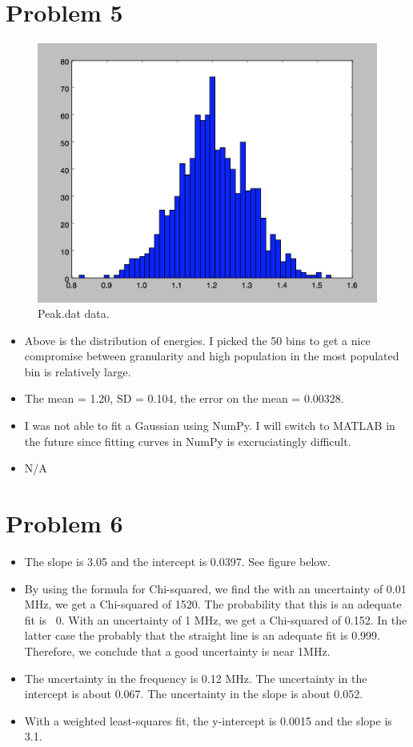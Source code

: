 \documentclass[12pt]{article}
\begin{document}
\clearpage


\section{Problem 5}

\begin{figure}[h!]
  \caption{Peak.dat data.}
  \centering
    \includegraphics[width=12 cm]{peak.png}
\end{figure}


\begin{itemize}
	\item Above is the distribution of energies. I picked the 50 bins to get a nice compromise between granularity and high population in the most populated bin is relatively large. 
	\item The mean = 1.20, SD = 0.104, the error on the mean = 0.00328.
	\item I was not able to fit a Gaussian using NumPy. I will switch to MATLAB in the future since fitting curves in NumPy is excruciatingly difficult. 
	\item N/A
\end{itemize}

\clearpage

\section{Problem 6}
\begin{itemize}
	\item The slope is 3.05 and the intercept is 0.0397. See figure below.
	\item By using the formula for Chi-squared, we find the with an uncertainty of 0.01 MHz, we get a Chi-squared of 1520. The probability that this is an adequate fit is ~0. With an uncertainty of 1 MHz, we get a Chi-squared of 0.152. In the latter case the probably that the straight line is an adequate fit is 0.999. Therefore, we conclude that a good uncertainty is near 1MHz. 
	\item The uncertainty in the frequency is 0.12 MHz. The uncertainty in the intercept is about 0.067. The uncertainty in the slope is about 0.052. 
	\item With a weighted least-squares fit, the y-intercept is 0.0015 and the slope is 3.1. 
\end{itemize}
\end{document}
